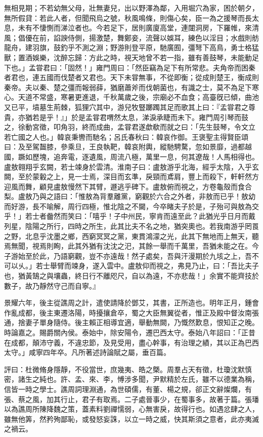 \begin{pinyinscope}
無相見期；不若幼無父母，壯無妻兒，出以野澤為鄰，入用堀穴為家，困於朝夕，無所假貸：若此人者，但聞飛烏之號，秋風鳴條，則傷心矣，臣一為之援琴而長太息，未有不悽惻而涕泣者也。今若足下，居則廣廈高堂，連闥洞房，下羅帷，來清風；倡優在前，諂諛侍側，揚激楚，舞鄭妾，流聲以娛耳，練色以淫目；水戲則舫龍舟，建羽旗，鼓釣乎不測之淵；野游則登平原，馳廣囿，彊弩下高鳥，勇士格猛獸；置酒娛樂，沈醉忘歸：方此之時，視天地曾不若一指，雖有善鼓琴，未能動足下也。」孟甞君曰：「固然！」雍門周曰：「然臣竊為足下有所常悲。夫角帝而困秦者君也，連五國而伐楚者又君也。天下未甞無事，不從即衡；從成則楚王，衡成則秦帝。夫以秦、楚之彊而報弱薛，猶磨蕭斧而伐朝菌也，有識之士，莫不為足下寒心。天道不常盛，寒暑更進退，千秋萬歲之後，宗廟必不血食；高臺旣已傾，曲池又已平，墳墓生荊棘，狐狸穴其中，游兒牧豎躑躅其足而歌其上曰：『孟甞君之尊貴，亦猶若是乎！』」於是孟甞君喟然太息，涕淚承睫而未下。雍門周引琴而鼓之，徐動宮徵，叩角羽，終而成曲，孟甞君遂歔欷而就之曰：「先生鼓琴，令文立若亡國之人也。」韓哀秉轡而馳名；呂氏春秋曰：韓哀作御。王褒聖主得賢臣頌曰：及至駕齧膝，參乘旦，王良執靶，韓哀附輿，縱馳騁騖，忽如景靡，過都越國，蹶如歷塊，追奔電，逐遺風，周流八極，萬里一息，何其遼哉！人馬相得也。盧敖翱翔乎玄闕，若士竦身於雲清。淮南子曰：盧敖游乎北海，經乎太陰，入乎玄闕，至於蒙轂之上，見一士焉，深目而玄準，戾頸而鳶肩，豐上而殺下，軒軒然方迎風而舞，顧見盧敖慢然下其臂，遯逃乎碑下。盧敖俯而視之，方卷龜殼而食合梨。盧敖乃與之語曰：「惟敖為背羣離黨，窮觀於六合之外者，非敖而已乎！敖幼而好游，長不喻解，周行四極，惟北陰之不闚，今卒睹夫子於是，子殆可與敖為交乎！」若士者齤然而笑曰：「嘻乎！子中州民，寧肯而遠至此？此猶光乎日月而戴列星，陰陽之所行，四時之所生，此其比夫不名之地，猶突奧也。若我南游乎罔䍚之野，北息乎沈墨之鄉，西窮冥冥之黨，東貫鴻濛之光，此其下無地而上無天，聽焉無聞，視焉則眴，此其外猶有沈沈之汜，其餘一舉而千萬里，吾猶未能之在。今子游始至於此，乃語窮觀，豈不亦遠哉！然子處矣，吾與汗漫期於九垓之上，吾不可以乆。」若士舉臂而竦身，遂入雲中。盧敖仰而視之，弗見乃止，曰：「吾比夫子也，猶黃鵠之與壤蟲，終日行不離咫尺，自以為遠，不亦悲哉！」余實不能齊技於數子，故乃靜然守己而自寧。』

景耀六年，後主從譙周之計，遣使請降於鄧艾，其書，正所造也。明年正月，鍾會作亂成都，後主東遷洛陽，時擾攘倉卒，蜀之大臣無翼從者，惟正及殿中督汝南張通，捨妻子單身隨侍。後主賴正相導宜適，舉動無闕，乃慨然歎息，恨知正之晚。時論嘉之。賜爵關內侯。泰始中，除安陽令，遷巴西太守。泰始八年詔曰：「正昔在成都，顛沛守義，不違忠節，及見受用，盡心幹事，有治理之績，其以正為巴西太守。」咸寧四年卒。凡所著述詩論賦之屬，垂百篇。

評曰：杜微脩身隱靜，不役當世，庶幾夷、皓之槩。周羣占天有徵，杜瓊沈默慎密，諸生之純也。許、孟、來、李，愽涉多聞，尹默精於左氏，雖不以德業為稱，信皆一時之學士。譙周詞理淵通，為世碩儒，有董、楊之規，郤正文辭燦爛，有張、蔡之風，加其行止，君子有取焉。二子處晉事少，在蜀事多，故著于篇。張璠以為譙周所陳降魏之策，蓋素料劉禪懦弱，心無害戾，故得行也。如遇忿肆之人，雖無他筭，然矜殉鄙恥，或發怒妄誅，以立一時之威，快其斯須之意者，此亦夷滅之禍云。


\end{pinyinscope}